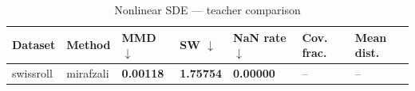 \begin{table}[ht]
  \centering
  \caption{Nonlinear SDE — teacher comparison}
  \label{tab:nl_teacher_compare}
  \begin{tabular}{lllllll}
    \toprule
    Dataset & Method & MMD $\downarrow$ & SW $\downarrow$ & NaN rate $\downarrow$ & Cov.\,frac. & Mean dist. \\
    \midrule
    swissroll & mirafzali & \textbf{0.00118} & \textbf{1.75754} & \textbf{0.00000} & -- & -- \\
    \bottomrule
  \end{tabular}
\end{table}
